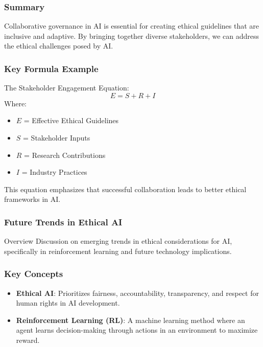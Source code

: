\documentclass[aspectratio=169]{beamer}
\begin{document}
\begin{frame}[fragile]
    \frametitle{Summary}
    Collaborative governance in AI is essential for creating ethical guidelines that are inclusive and adaptive. By bringing together diverse stakeholders, we can address the ethical challenges posed by AI.
\end{frame}

\begin{frame}[fragile]
    \frametitle{Key Formula Example}
    The Stakeholder Engagement Equation:
    \begin{equation}
        E = S + R + I
    \end{equation}
    Where:
    \begin{itemize}
        \item \(E\) = Effective Ethical Guidelines
        \item \(S\) = Stakeholder Inputs
        \item \(R\) = Research Contributions
        \item \(I\) = Industry Practices
    \end{itemize}
    This equation emphasizes that successful collaboration leads to better ethical frameworks in AI.
\end{frame}

\begin{frame}[fragile]
    \frametitle{Future Trends in Ethical AI}
    \begin{block}{Overview}
        Discussion on emerging trends in ethical considerations for AI, specifically in reinforcement learning and future technology implications.
    \end{block}
\end{frame}

\begin{frame}[fragile]
    \frametitle{Key Concepts}
    \begin{itemize}
        \item \textbf{Ethical AI}: Prioritizes fairness, accountability, transparency, and respect for human rights in AI development.
        \item \textbf{Reinforcement Learning (RL)}: A machine learning method where an agent learns decision-making through actions in an environment to maximize reward.
    \end{itemize}
\end{frame}
\end{document}
